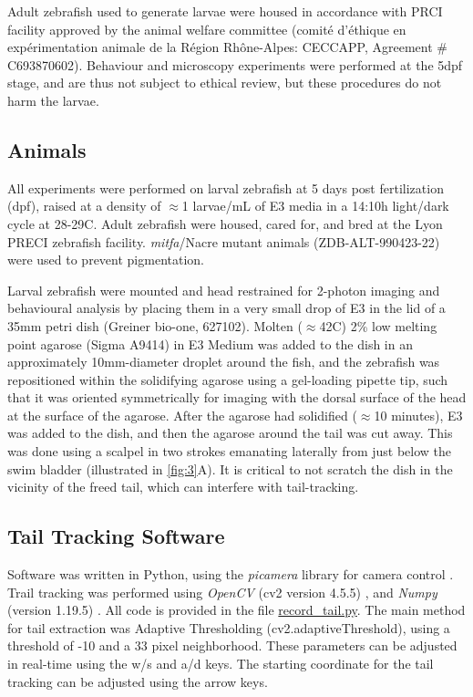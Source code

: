 \documentclass[9pt,lineno]{RandlettLab_elife}
\begin{document}
Adult zebrafish used to generate larvae were housed in accordance with PRCI facility approved by the animal welfare committee (comité d’éthique en expérimentation animale de la Région Rhône-Alpes: CECCAPP, Agreement \# C693870602). Behaviour and microscopy experiments were performed at the 5dpf stage, and are thus not subject to ethical review, but these procedures do not harm the larvae. 

\subsection{Animals}

All experiments were performed on larval zebrafish at 5 days post fertilization (dpf), raised at a density of $\approx$1 larvae/mL of E3 media in a 14:10h light/dark cycle at 28-29\degree{}C. Adult zebrafish were housed, cared for, and bred at the Lyon PRECI zebrafish facility. \textit{mitfa}/Nacre mutant animals (ZDB-ALT-990423-22) were used to prevent pigmentation. 

Larval zebrafish were mounted and head restrained for 2-photon imaging and behavioural analysis by placing them in a very small drop of E3 in the lid of a 35mm petri dish (Greiner bio-one, 627102). Molten ($\approx$42\degree{}C) 2\% low melting point agarose (Sigma A9414) in E3 Medium was added to the dish in an approximately 10mm-diameter droplet around the fish, and the zebrafish was repositioned within the solidifying agarose using a gel-loading pipette tip, such that it was oriented symmetrically for imaging with the dorsal surface of the head at the surface of the agarose. After the agarose had solidified ($\approx$10 minutes), E3 was added to the dish, and then the agarose around the tail was cut away. This was done using a scalpel in two strokes emanating laterally from just below the swim bladder (illustrated in \autoref{fig:3}A). It is critical to not scratch the dish in the vicinity of the freed tail, which can interfere with tail-tracking. 


\subsection{Tail Tracking Software}

Software was written in Python, using the \emph{picamera} library for camera control \citep{picamera}. Trail tracking was performed using \emph{OpenCV} (cv2 version 4.5.5) \citep{opencv_library}, and \emph{Numpy} (version 1.19.5) \citep{harris2020array}. All code is provided in the file \href{https://github.com/owenrandlett/pi_tailtrack/blob/main/record_tail.py}{record\_tail.py}. The main method for tail extraction was Adaptive Thresholding (cv2.adaptiveThreshold), using a threshold of -10 and a 33 pixel neighborhood. These parameters can be adjusted in real-time using the w/s and a/d keys. The starting coordinate for the tail tracking can be adjusted using the arrow keys. 
\end{document}
